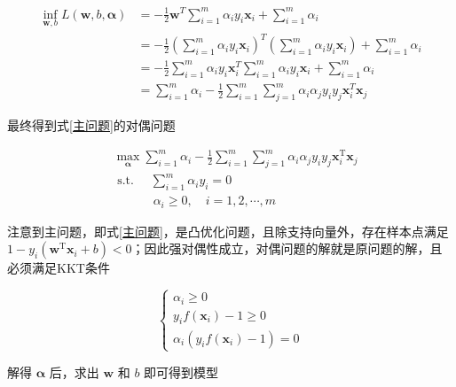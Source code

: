 \documentclass{ctexart}
\begin{document}
	\begin{equation}
		\begin{aligned}
			\inf _{\boldsymbol{w}, b} L(\boldsymbol{w}, b, \boldsymbol{\alpha}) &=-\frac{1}{2} \boldsymbol{w}^{T} \sum_{i=1}^{m} \alpha_{i} y_{i} \boldsymbol{x}_{i}+\sum_{i=1}^{m} \alpha_{i} \\
			&=-\frac{1}{2}\left(\sum_{i=1}^{m} \alpha_{i} y_{i} \boldsymbol{x}_{i}\right)^{T}\left(\sum_{i=1}^{m} \alpha_{i} y_{i} \boldsymbol{x}_{i}\right)+\sum_{i=1}^{m} \alpha_{i} \\
			&=-\frac{1}{2} \sum_{i=1}^{m} \alpha_{i} y_{i} \boldsymbol{x}_{i}^{T} \sum_{i=1}^{m} \alpha_{i} y_{i} \boldsymbol{x}_{i}+\sum_{i=1}^{m} \alpha_{i} \\
			&=\sum_{i=1}^{m} \alpha_{i}-\frac{1}{2} \sum_{i=1}^{m} \sum_{j=1}^{m} \alpha_{i} \alpha_{j} y_{i} y_{j} \boldsymbol{x}_{i}^{T} \boldsymbol{x}_{j}
		\end{aligned}
	\end{equation}
	
	最终得到式\eqref{主问题}的对偶问题
	
	\begin{equation}
		\begin{aligned}
			&\max _{\boldsymbol{\alpha}} \sum_{i=1}^{m} \alpha_{i}-\frac{1}{2} \sum_{i=1}^{m} \sum_{j=1}^{m} \alpha_{i} \alpha_{j} y_{i} y_{j} \boldsymbol{x}_{i}^{\mathrm{T}}\boldsymbol{x}_j \\
			&\text { s.t. } \quad \sum_{i=1}^{m} \alpha_{i} y_{i}=0 \\
			&\ \quad\quad\quad \alpha_{i} \geqslant 0, \quad i=1,2, \cdots, m
		\end{aligned}
	\end{equation}

	注意到主问题，即式\eqref{主问题}，是凸优化问题，且除支持向量外，存在样本点满足 $1-y_i(\boldsymbol{w}^{\mathrm{T}}\boldsymbol{x}_i+b)<0$；因此强对偶性成立，对偶问题的解就是原问题的解，且必须满足KKT条件
	
	\begin{equation}
		\left\{\begin{array}{l}
			\alpha_{i} \geqslant 0 \\
			y_{i} f\left(\boldsymbol{x}_{i}\right)-1 \geqslant 0 \\
			\alpha_{i}\left(y_{i} f\left(\boldsymbol{x}_{i}\right)-1\right)=0
		\end{array}\right.
		\label{KKT}
	\end{equation}

	解得 $\boldsymbol{\alpha}$ 后，求出 $\boldsymbol{w}$ 和 $b$ 即可得到模型
	
\end{document}
